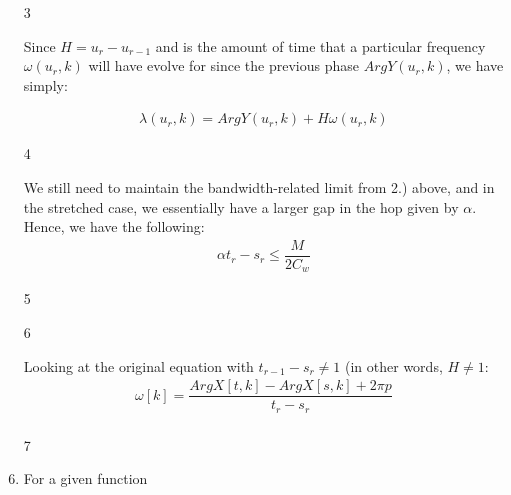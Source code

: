 \documentclass[12pt]{article}
\begin{document}
\begin{enumerate}
\item[3]{

Since $H = u_r-u_{r-1}$ and is the amount of time that a particular frequency $\omega(u_r,k)$ will have evolve for since the previous phase $Arg Y (u_r,k)$, we have simply:

\begin{align*}
\lambda(u_r, k) = Arg Y (u_r,k) +H\omega(u_r,k)
\end{align*}

}

\item[4]{

We still need to maintain the bandwidth-related limit from 2.) above, and in the stretched case, we essentially have a larger gap in the hop given by $\alpha$. Hence, we have the following:
\begin{align*}
\alpha t_r - s_r \leq \dfrac{M}{2C_w}
\end{align*}

}

\item[5]{

}

\item[6]{

Looking at the original equation with $t_{r-1}-s_r  \neq 1$ (in other words, $H \neq 1$:
\begin{align*}
\omega[k] = \dfrac{Arg X [t,k] - Arg X [s, k] + 2\pi p}{t_r-s_r}\\
\end{align*}

}

\item[7]{

}

\item{
For a given function

}
\end{enumerate}
\end{document}
